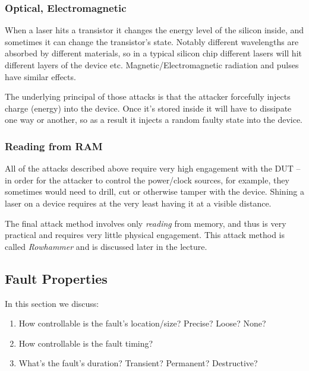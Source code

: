\subsubsection{Optical, Electromagnetic}\label{subsubsec:optical_electromagnetic}
When a laser hits a transistor it changes the energy level of the silicon
inside, and sometimes it can change the transistor's state. Notably different
wavelengths are absorbed by different materials, so in a typical silicon chip
different lasers will hit different layers of the device etc.
Magnetic/Electromagnetic radiation and pulses have similar effects.

The underlying principal of those attacks is that the attacker forcefully
injects charge (energy) into the device. Once it's stored inside it will have to
dissipate one way or another, so as a result it injects a random faulty state
into the device.

\subsubsection{Reading from RAM}\label{subsubsec:reading_from_ram}
All of the attacks described above require very high engagement with the DUT --
in order for the attacker to control the power/clock sources, for example, they
sometimes would need to drill, cut or otherwise tamper with the device. Shining
a laser on a device requires at the very least having it at a visible distance.

The final attack method involves only \emph{reading} from memory, and thus is
very practical and requires very little physical engagement. This attack method
is called \emph{Rowhammer} and is discussed later in the lecture.


\subsection{Fault Properties}\label{subsec:fault_properties}
In this section we discuss:
\begin{enumerate}
	\item How controllable is the fault's location/size? Precise? Loose? None?
	\item How controllable is the fault timing?
	\item What's the fault's duration? Transient? Permanent? Destructive?
\end{enumerate}


